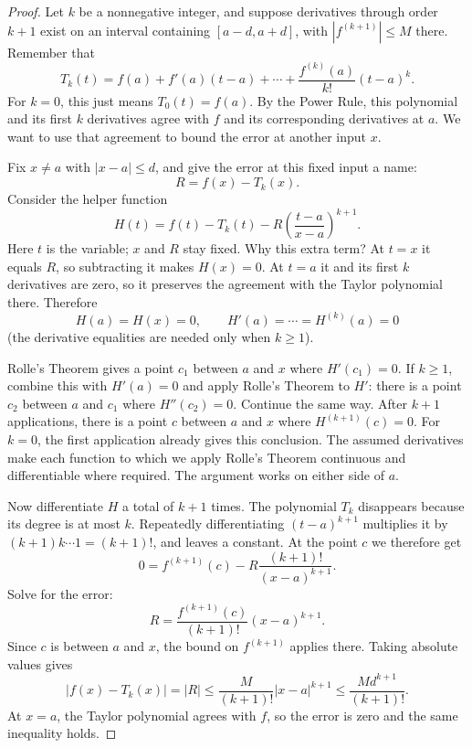 
\begin{proof}
Let $k$ be a nonnegative integer, and suppose derivatives through
order $k+1$ exist on an interval containing $[a-d,a+d]$, with
$|f^{(k+1)}|\leq M$ there. Remember that
$$T_k(t)=f(a)+f'(a)(t-a)+\cdots+
\frac{f^{(k)}(a)}{k!}(t-a)^k.$$
For $k=0$, this just means $T_0(t)=f(a)$.
By the Power Rule, this polynomial and its first $k$ derivatives agree
with $f$ and its corresponding derivatives at $a$. We want to use that
agreement to bound the error at another input $x$.

Fix $x\ne a$ with $|x-a|\leq d$, and give the error at this fixed input
a name:
$$R=f(x)-T_k(x).$$
Consider the helper function
$$H(t)=f(t)-T_k(t)-R\left(\frac{t-a}{x-a}\right)^{k+1}.$$
Here $t$ is the variable; $x$ and $R$ stay fixed. Why this extra term?
At $t=x$ it equals $R$, so subtracting it makes $H(x)=0$. At $t=a$
it and its first $k$ derivatives are zero, so it preserves the agreement
with the Taylor polynomial there. Therefore
$$H(a)=H(x)=0,\qquad
H'(a)=\cdots=H^{(k)}(a)=0$$
(the derivative equalities are needed only when $k\geq1$).

Rolle's Theorem gives a point $c_1$ between $a$ and $x$ where
$H'(c_1)=0$. If $k\geq1$, combine this with $H'(a)=0$ and apply
Rolle's Theorem to $H'$: there is a point $c_2$ between $a$ and $c_1$
where $H''(c_2)=0$. Continue the same way. After $k+1$ applications,
there is a point $c$ between $a$ and $x$ where $H^{(k+1)}(c)=0$.
For $k=0$, the first application already gives this conclusion.
The assumed derivatives make each function to which we apply Rolle's
Theorem continuous and differentiable where required. The argument
works on either side of $a$.

Now differentiate $H$ a total of $k+1$ times. The polynomial $T_k$
disappears because its degree is at most $k$. Repeatedly differentiating
$(t-a)^{k+1}$ multiplies it by $(k+1)k\cdots1=(k+1)!$, and leaves a
constant. At the point $c$ we therefore get
$$0=f^{(k+1)}(c)-R\frac{(k+1)!}{(x-a)^{k+1}}.$$
Solve for the error:
$$R=\frac{f^{(k+1)}(c)}{(k+1)!}(x-a)^{k+1}.$$
Since $c$ is between $a$ and $x$, the bound on $f^{(k+1)}$ applies there.
Taking absolute values gives
$$|f(x)-T_k(x)|=|R|
\leq\frac{M}{(k+1)!}|x-a|^{k+1}
\leq\frac{Md^{k+1}}{(k+1)!}.$$
At $x=a$, the Taylor polynomial agrees with $f$, so the error is zero
and the same inequality holds.
\end{proof}
